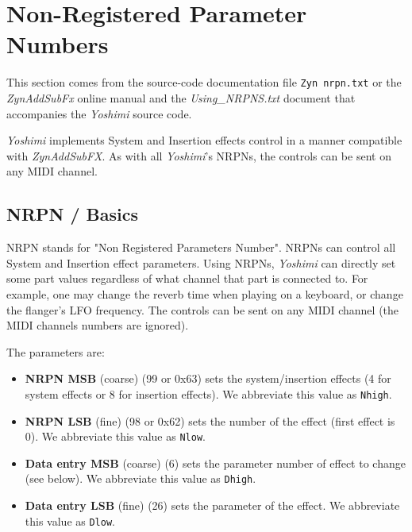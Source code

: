 %
%
%

\section{Non-Registered Parameter Numbers}
\label{sec:nrpns}

   This section comes from the source-code documentation file
   \texttt{Zyn nrpn.txt} or the \textsl{ZynAddSubFx}
   online manual \cite{zyndoc} and the \textsl{Using\_NRPNS.txt} document that
   accompanies the \textsl{Yoshimi} source code.

   \textsl{Yoshimi} implements System and Insertion effects control in a
   manner compatible with \textsl{ZynAddSubFX}. As with all
   \textsl{Yoshimi}'s NRPNs, the controls can be sent on any MIDI channel.

\subsection{NRPN / Basics}
\label{subsection:nrpns_midi_nrpn_basics}

   NRPN stands for "Non Registered Parameters Number".
   NRPNs can control all System and Insertion effect parameters.
   Using NRPNs, \textsl{Yoshimi} can directly set some part values
   regardless of what channel that part is connected to.  For example, one
   may change the reverb time when playing on a keyboard, or
   change the flanger's LFO frequency.
   The controls can be sent on any MIDI channel
   (the MIDI channels numbers are ignored).

   The parameters are:

   \begin{itemize}
      \item \textbf{NRPN MSB}
      (coarse) (99 or 0x63) sets the system/insertion effects
      (4 for system effects or 8 for insertion effects).
      We abbreviate this value as \texttt{Nhigh}.
      \item \textbf{NRPN LSB}
      (fine) (98 or 0x62) sets the number of the effect (first
      effect is 0).
      We abbreviate this value as \texttt{Nlow}.
      \item \textbf{Data entry MSB}
      (coarse) (6) sets the parameter number of effect to
      change (see below).
      We abbreviate this value as \texttt{Dhigh}.
      \item \textbf{Data entry LSB}
      (fine) (26) sets the parameter of the effect.
      We abbreviate this value as \texttt{Dlow}.
   \end{itemize}

